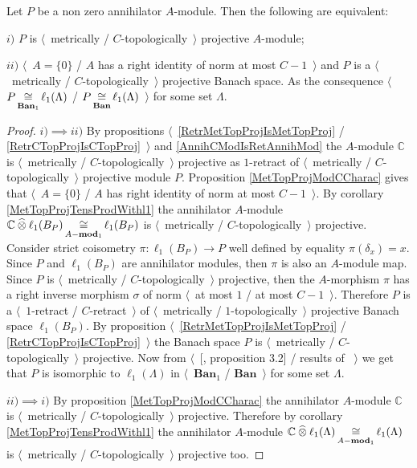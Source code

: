 \begin{proposition}\label{MetTopProjOfAnnihModCharac} Let $P$ be a non zero  annihilator $A$-module. Then the following are equivalent:

$i)$ $P$ is $\langle$~metrically / $C$-topologically~$\rangle$ projective $A$-module;

$ii)$ $\langle$~$A=\{0\}$ / $A$ has a right identity of norm at most $C-1$~$\rangle$ and $P$ is a $\langle$~metrically / $C$-topologically~$\rangle$ projective Banach space. As the consequence $\langle$~$P\mathop{\mathbin{\cong}}\limits_{\mathbf{Ban}_1}\ell_1(\Lambda)$ / $P\mathop{\mathbin{\cong}}\limits_{\mathbf{Ban}}\ell_1(\Lambda)$~$\rangle$ for some set $\Lambda$.
\end{proposition}
\begin{proof} $i)$$\implies$$ ii)$ By propositions $\langle$~\ref{RetrMetTopProjIsMetTopProj} / \ref{RetrCTopProjIsCTopProj}~$\rangle$ and \ref{AnnihCModIsRetAnnihMod} the $A$-module $\mathbb{C}$ is $\langle$~metrically / $C$-topologically~$\rangle$ projective as $1$-retract of $\langle$~metrically / $C$-topologically~$\rangle$ projective module $P$. Proposition \ref{MetTopProjModCCharac} gives that $\langle$~$A=\{0\}$ / $A$ has right identity of norm at most $C-1$~$\rangle$.  By corollary \ref{MetTopProjTensProdWithl1} the annihilator $A$-module $\mathbb{C}\mathbin{\widehat{\otimes}}\ell_1(B_P)\mathop{\mathbin{\cong}}\limits_{A-\mathbf{mod}_1}\ell_1(B_P)$ is $\langle$~metrically / $C$-topologically~$\rangle$ projective. Consider strict coisometry $\pi:\ell_1(B_P)\to P$ well defined by equality $\pi(\delta_x)=x$. Since $P$ and $\ell_1(B_P)$ are annihilator modules, then $\pi$ is also an $A$-module map. Since $P$ is $\langle$~metrically / $C$-topologically~$\rangle$ projective, then the $A$-morphism $\pi$ has a right inverse morphism $\sigma$ of norm  $\langle$~at most $1$ / at most $C-1$~$\rangle$. Therefore $P$ is a $\langle$~$1$-retract / $C$-retract~$\rangle$ of $\langle$~metrically / $1$-topologically~$\rangle$ projective Banach space $\ell_1(B_P)$. By proposition $\langle$~\ref{RetrMetTopProjIsMetTopProj} / \ref{RetrCTopProjIsCTopProj}~$\rangle$ the Banach space $P$ is $\langle$~metrically / $C$-topologically~$\rangle$ projective. Now from $\langle$~[\cite{HelMetrFrQMod}, proposition 3.2] / results of \cite{KotheTopProjBanSp}~$\rangle$ we get that $P$ is isomorphic to $\ell_1(\Lambda)$ in $\langle$~$\mathbf{Ban}_1$ / $\mathbf{Ban}$~$\rangle$ for some set $\Lambda$. 

$ii)$$\implies$$ i)$ By proposition \ref{MetTopProjModCCharac} the annihilator $A$-module $\mathbb{C}$ is $\langle$~metrically / $C$-topologically~$\rangle$ projective. Therefore by corollary \ref{MetTopProjTensProdWithl1} the annihilator $A$-module $\mathbb{C}\mathbin{\widehat{\otimes}}\ell_1(\Lambda)\mathop{\mathbin{\cong}}\limits_{A-\mathbf{mod}_1}\ell_1(\Lambda)$ is $\langle$~metrically / $C$-topologically~$\rangle$ projective too.
\end{proof}

